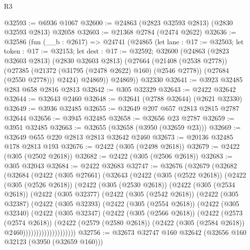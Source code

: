 \begin{lexlean}{R3}
\begin{coremodule}
@32593 := @6936 @1067
@32600 := @24863 (@2823 @32593 @2813) (@2830 @32593 @2813) @32058
@32603 := @21368 @2784 (@2474 @2622)
@32636 := @32586
    (fun (__b : @2617) =>
    @24741
      (@24865
        (let lane : @17 := @32503;
        let token : @17 := @32153;
        let dest : @17 := @32592;
        @32600
          (@24863
            (@2823 @32603 @2813)
            (@2830 @32603 @2813)
            (@27664
              (@21408 (@2538 @2778))
              (@27385 (@21372 (@31795 (@2478 @2622) @160) (@2546 @2778)) (@27684 (@2550 @2778)))
              @2424)
            @24869))
        @24869))
    @32330
@32641 := @3923 @32485 @283 @658 @2816 @2813
@32642 := @305 @32329
@32643 := @2422 @32642
@32644 := @32643 @2460
@32648 := @32641 (@2788 @32644) (@2621 @32330)
@32649 := @3936 @32485
@32655 := @32649 @207 @657 @2813 @2815 @2787 @32644
@32656 := @3945 @32485
@32658 := @32656 @23 @2787
@32659 := @3951 @32485
@32663 := @32655 (@32658 (@3950 (@32659 @23)))
@32669 := @32649 @655 @220 @2813 @2813 @32642 @2460
@32673 := @20136 @32485 @178 @2813 @193
@32676 := @2422 (@305 (@2498 @2618))
@32679 := @2422 (@305 (@2502 @2618))
@32682 := @2422 (@305 (@2506 @2618))
@32683 := @305 @32043
@32684 := @2422 @32683
@32747 := @32676
    (@32679
      (@32682
        (@32684
          (@2422
            (@305 @27661)
            (@32643
              (@2422
                (@305 (@2522 @2618))
                (@2422
                  (@305 (@2526 @2618))
                  (@2422
                    (@305 (@2530 @2618))
                    (@2422
                      (@305 (@2534 @2618))
                      (@2422
                        (@305 @32377)
                        (@2422
                          (@305 (@2542 @2618))
                          (@2422
                            (@305 @32387)
                            (@2422
                              (@305 @32393)
                              (@2422
                                (@305 (@2554 @2618))
                                (@2422
                                  (@305 @32340)
                                  (@2422
                                    (@305 @32347)
                                    (@2422
                                      (@305 (@2566 @2618))
                                      (@2422
                                        (@2573 (@2574 @2618))
                                        (@2422
                                          (@2579 (@2580 @2618))
                                          (@2422 (@305 (@2584 @2618)) @2460))))))))))))))))))))
@32756 := @32673 @32747 @160 @32642 (@32656 @160 @32123 (@3950 (@32659 @160)))

\end{coremodule}
\end{lexlean}
